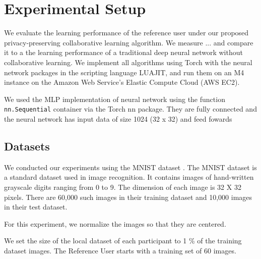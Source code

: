 \documentclass[conference]{IEEEtran}
\begin{document}
\section{Experimental Setup}

We evaluate the learning performance of the reference user under our proposed privacy-preserving collaborative learning algorithm. We
measure ... and compare it to a the learning performance of a traditional deep neural network without collaborative learning. 
We implement all algorithms using Torch with the neural network packages in the scripting language LUAJIT, and run them 
on an M4 instance on the Amazon Web Service's Elastic Compute Cloud (AWS EC2).

We used the MLP implementation of neural network using the function \texttt{nn.Sequential} container via the Torch nn package. They are
fully connected and the neural network has input data of size 1024 (32 x 32) and feed fowards

\subsection{Datasets}
We conducted our experiments using the MNIST dataset \cite{deng2012mnist}. The MNIST dataset is a standard dataset used in image
recognition.
It contains images of hand-written grayscale digits ranging from 0 to 9. The dimension of each image is 32 X 32 pixels. There
are 60,000 such images in their training dataset and 10,000 images in their test dataset.

For this experiment, we normalize the images so that they are centered. 

We set the size of the local dataset of each participant to 1 \% of the training dataset images. 
The Reference User starts with a training set of 60 images.

\end{document}
